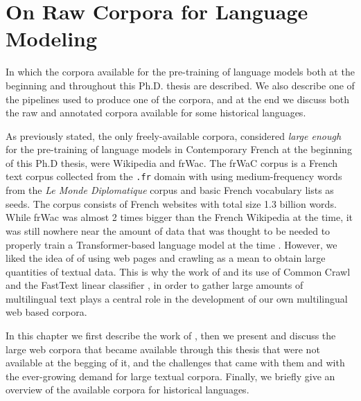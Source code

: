 \chapter{On Raw Corpora for Language Modeling}

\begin{center}
    \begin{minipage}{0.66\textwidth}
        \begin{small}
            In which the corpora available for the pre-training of language models both at the beginning and throughout this Ph.D. thesis are described. We also describe one of the pipelines used to produce one of the corpora, and at the end we discuss both the raw and annotated corpora available for some historical languages.
        \end{small}
    \end{minipage}
    \vspace{0.5cm}
\end{center}

As previously stated, the only freely-available corpora, considered \emph{large enough} for the pre-training of language models in Contemporary French at the beginning of this Ph.D thesis, were Wikipedia and frWac. The frWaC corpus \citep{baroni-etal-2009-the} is a French text corpus collected from the \texttt{.fr} domain with using medium-frequency words from the \emph{Le Monde Diplomatique} corpus and basic French vocabulary lists as seeds. The corpus consists of French websites with total size 1.3 billion words. While frWac was almost 2 times bigger than the French Wikipedia at the time, it was still nowhere near the amount of data that was thought to be needed to properly train a Transformer-based language model at the time \citep{liu-etal-2019-roberta}. However, we liked the idea of \citet{baroni-etal-2009-the} of using web pages and crawling as a mean to obtain large quantities of textual data. This is why the work of \citet{mikolov-etal-2018-advances} and its use of Common Crawl and the FastText linear classifier \citep{joulin-etal-2016-fasttext, joulin-etal-2017-bag}, in order to gather large amounts of multilingual text plays a central role in the development of our own multilingual web based corpora.

In this chapter we first describe the work of \citet{mikolov-etal-2018-advances}, then we present and discuss the large web corpora that became available through this thesis that were not available at the begging of it, and the challenges that came with them and with the ever-growing demand for large textual corpora. Finally, we briefly give an overview of the available corpora for historical languages.

